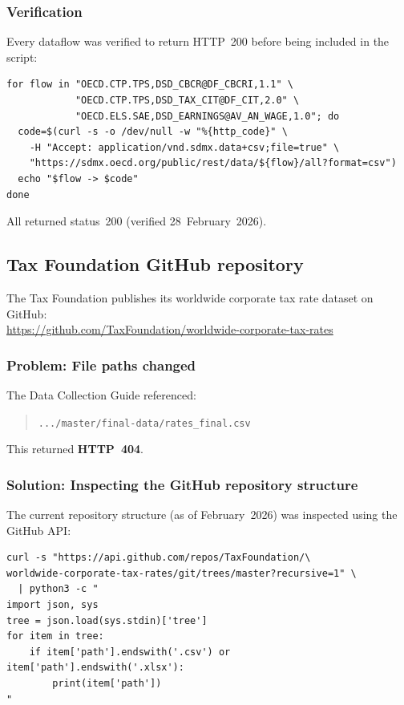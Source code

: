 \documentclass[12pt,a4paper]{article}
\begin{document}
\subsubsection{Verification}

Every dataflow was verified to return HTTP~200 before being included in the script:

\begin{lstlisting}[style=shellstyle,caption={Verifying all OECD endpoints}]
for flow in "OECD.CTP.TPS,DSD_CBCR@DF_CBCRI,1.1" \
            "OECD.CTP.TPS,DSD_TAX_CIT@DF_CIT,2.0" \
            "OECD.ELS.SAE,DSD_EARNINGS@AV_AN_WAGE,1.0"; do
  code=$(curl -s -o /dev/null -w "%{http_code}" \
    -H "Accept: application/vnd.sdmx.data+csv;file=true" \
    "https://sdmx.oecd.org/public/rest/data/${flow}/all?format=csv")
  echo "$flow -> $code"
done
\end{lstlisting}

All returned status~200 (verified 28~February~2026).


\subsection{Tax Foundation GitHub repository}\label{sec:tf_discovery}

The Tax Foundation publishes its worldwide corporate tax rate dataset on GitHub:\\
\url{https://github.com/TaxFoundation/worldwide-corporate-tax-rates}

\subsubsection{Problem: File paths changed}

The Data Collection Guide referenced:
\begin{quote}
\small\texttt{.../master/final-data/rates\_final.csv}
\end{quote}
This returned \textbf{HTTP~404}.

\subsubsection{Solution: Inspecting the GitHub repository structure}

The current repository structure (as of February~2026) was inspected using the GitHub API:

\begin{lstlisting}[style=shellstyle,caption={Discovering Tax Foundation file paths}]
curl -s "https://api.github.com/repos/TaxFoundation/\
worldwide-corporate-tax-rates/git/trees/master?recursive=1" \
  | python3 -c "
import json, sys
tree = json.load(sys.stdin)['tree']
for item in tree:
    if item['path'].endswith('.csv') or item['path'].endswith('.xlsx'):
        print(item['path'])
"
\end{lstlisting}
\end{document}
